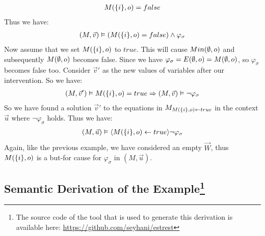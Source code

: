 \documentclass{article}
\begin{document}
\begin{example}
\begin{align*}
        M(\{i\}, o)   & = false \\
    \end{align*}
    Thus we have:
    \begin{align*}
        (M,\vec v) \vDash (M(\{i\},o) = false)  \wedge \varphi_{\sigma}
    \end{align*}
    Now assume that we set $M(\{i\},o)$ to $true$.
    This will cause $Min(\emptyset,o)$ and subsequently $M(\emptyset,o)$ becomes false.
    Since we have $\varphi_{\sigma} = E(\emptyset,o) = M(\emptyset,o)$, so
    $\varphi_{\sigma}$ becomes false too.
    Consider $\vec v'$ as the new values of variables after our
    intervention.
    So we have:
    \begin{align*}
        (M,\vec v')\vDash M(\{i\},o) = true
        \Rightarrow
        (M,\vec v) \vDash \neg \varphi_{\sigma}
    \end{align*}
    So we have found a solution $\vec v'$ to the equations in
    $M_{M(\{i\},o)\leftarrow true}$ in the context $\vec u$ where $\neg \varphi_{\sigma}$ holds.
    Thus we have:
    \begin{align*}
        (M,\vec u) \vDash \langle M(\{i\},o) \leftarrow true \rangle \neg \varphi_{\sigma}
    \end{align*}
    Again, like the previous example, we have considered an empty $\vec W$, thus $M(\{i\},o)$ is a but-for cause for $\varphi_{\sigma}$ in $(M,\vec u)$.
\end{example}


\pagebreak
\begin{appendices}
    \section{Semantic Derivation of the Example\protect\footnote[1]
      {The source code of the tool that is used to
          generate this derivation is available here:
          \href{https://github.com/seyhani/estrest}
          {https://github.com/seyhani/estrest}
      }
     }
\end{appendices}
\end{document}
